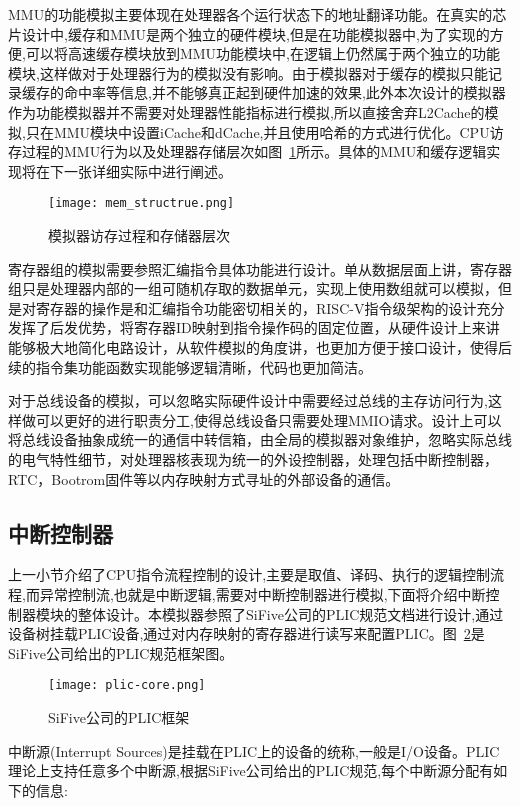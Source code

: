MMU的功能模拟主要体现在处理器各个运行状态下的地址翻译功能。在真实的芯片设计中,缓存和MMU是两个独立的硬件模块,但是在功能模拟器中,为了实现的方便,可以将高速缓存模块放到MMU功能模块中,在逻辑上仍然属于两个独立的功能模块,这样做对于处理器行为的模拟没有影响。由于模拟器对于缓存的模拟只能记录缓存的命中率等信息,并不能够真正起到硬件加速的效果,此外本次设计的模拟器作为功能模拟器并不需要对处理器性能指标进行模拟,所以直接舍弃L2Cache的模拟,只在MMU模块中设置iCache和dCache,并且使用哈希的方式进行优化。CPU访存过程的MMU行为以及处理器存储层次如图~\ref{fig:mem_structrue}所示。具体的MMU和缓存逻辑实现将在下一张详细实际中进行阐述。
\begin{figure}[H]
  \centering
  \texttt{[image: mem\_structrue.png]}
  \caption{模拟器访存过程和存储器层次}
  \label{fig:mem_structrue}
\end{figure}


寄存器组的模拟需要参照汇编指令具体功能进行设计。单从数据层面上讲，寄存器组只是处理器内部的一组可随机存取的数据单元，实现上使用数组就可以模拟，但是对寄存器的操作是和汇编指令功能密切相关的，RISC-V指令级架构的设计充分发挥了后发优势，将寄存器ID映射到指令操作码的固定位置，从硬件设计上来讲能够极大地简化电路设计，从软件模拟的角度讲，也更加方便于接口设计，使得后续的指令集功能函数实现能够逻辑清晰，代码也更加简洁。


对于总线设备的模拟，可以忽略实际硬件设计中需要经过总线的主存访问行为,这样做可以更好的进行职责分工,使得总线设备只需要处理MMIO请求。设计上可以将总线设备抽象成统一的通信中转信箱，由全局的模拟器对象维护，忽略实际总线的电气特性细节，对处理器核表现为统一的外设控制器，处理包括中断控制器，RTC，Bootrom固件等以内存映射方式寻址的外部设备的通信。

\subsection{中断控制器}
上一小节介绍了CPU指令流程控制的设计,主要是取值、译码、执行的逻辑控制流程,而异常控制流,也就是中断逻辑,需要对中断控制器进行模拟,下面将介绍中断控制器模块的整体设计。本模拟器参照了SiFive公司的PLIC规范文档进行设计,通过设备树挂载PLIC设备,通过对内存映射的寄存器进行读写来配置PLIC。图~\ref{fig:plic-core}是SiFive公司给出的PLIC规范框架图。
\begin{figure}[H]
    \centering
    \texttt{[image: plic-core.png]}
    \caption{SiFive公司的PLIC框架}
    \label{fig:plic-core}
\end{figure}


中断源(Interrupt Sources)是挂载在PLIC上的设备的统称,一般是I/O设备。PLIC理论上支持任意多个中断源,根据SiFive公司给出的PLIC规范,每个中断源分配有如下的信息:


